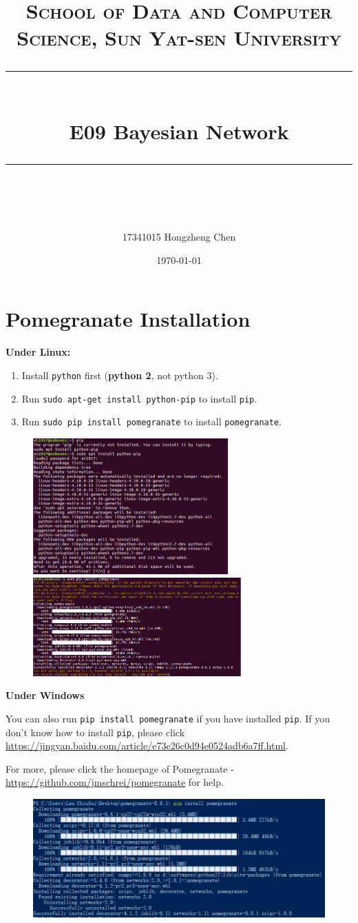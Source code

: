 \documentclass[a4paper, 11pt]{article}
\title{	
\normalfont \normalsize
\textsc{School of Data and Computer Science, Sun Yat-sen University} \\ [25pt] %
\rule{\textwidth}{0.5pt} \\[0.4cm] %
\huge  E09 Bayesian Network \\ %
\rule{\textwidth}{2pt} \\[0.5cm] %
\author{17341015 Hongzheng Chen}
\date{\normalsize\today}
}
\begin{document}
\maketitle
\tableofcontents
\newpage

\section{Pomegranate Installation}
\textbf{Under Linux:}
\begin{enumerate}
\item Install \texttt{python} first (\textbf{python 2}, not python 3).
\item Run \texttt{sudo apt-get install python-pip} to install \texttt{pip}.
\item Run \texttt{sudo pip install pomegranate} to install \texttt{pomegranate}.
\end{enumerate}
\begin{figure}[h]
  \centering
  \includegraphics[width=7.5cm]{fig/install1}
  \qquad
  \includegraphics[width=8cm]{fig/install2}
\end{figure}
\textbf{Under Windows}

You can also run \texttt{pip install pomegranate} if you have installed \texttt{pip}. If you don't know how to install \texttt{pip}, please click \url{https://jingyan.baidu.com/article/e73e26c0d94e0524adb6a7ff.html}.

For more, please click the homepage of Pomegranate - \url{https://github.com/jmschrei/pomegranate} for help. 
\begin{figure}[h]

  
  \centering
\includegraphics[width=16cm]{fig/po}
  
\end{figure}
\end{document}
